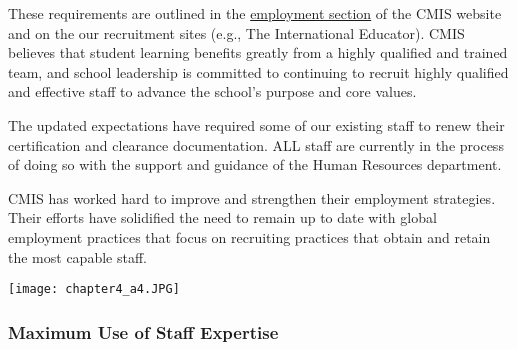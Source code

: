 \begin{findings}
These requirements are outlined in the \href{http://cmis.ac.th/about/employment}{employment section} of the CMIS website and on the our recruitment sites (e.g., The International Educator). CMIS believes that student learning benefits greatly from a highly qualified and trained team, and school leadership is committed to continuing to recruit highly qualified and effective staff to advance the school’s purpose and core values.

The updated expectations have required some of our existing staff to renew their certification and clearance documentation. ALL staff are currently in the process of doing so with the support and guidance of the Human Resources department.


CMIS has worked hard to improve and strengthen their employment strategies. Their efforts have solidified the need to remain up to date with global employment practices that focus on recruiting practices that obtain and retain the most capable staff.
\end{findings}

{\centering\texttt{[image: chapter4\_a4.JPG]}}
 
\subsubsection{Maximum Use of Staff Expertise}



